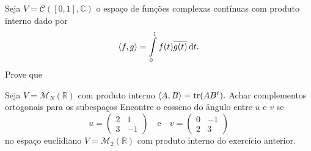 \documentclass[11pt,a4paper]{article}
\begin{document}
 Seja $V = \mathcal{C}([0,1], \mathbb{C})$ o espaço de funções complexas contínuas com produto interno dado por
\[
\prin{f,g} = \displaystyle \int\limits_{0}^1 f(t) \overline{g(t)} \dif t.
\]
Prove que
\solucao{}

 Seja $V = \mathcal{M}_N(\mathbb{R})$ com produto interno $\left\langle A,B \right\rangle = \mathrm{tr }(AB^t).$ Achar complementos ortogonais para os subespaços
\solucao{}
Encontre o cosseno do ângulo entre $u$ e $v$ se 
\[
u = \begin{pmatrix}
2 & 1 \\ 3 & -1
\end{pmatrix} \quad \mbox{e} \quad v = \begin{pmatrix}
0 & -1 \\ 2 & 3
\end{pmatrix}
\]
no espaço euclidiano $V = \mathcal{M}_2(\mathbb{R})$ com produto interno do exercício anterior.
\end{document}
